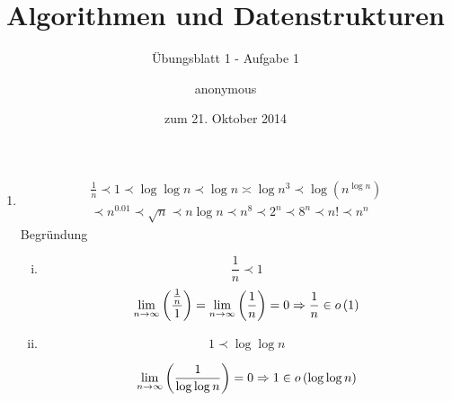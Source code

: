 \documentclass[a4paper]{scrartcl}
\title{Algorithmen und Datenstrukturen}
\subtitle{Übungsblatt 1 - Aufgabe 1}
\author{
    anonymous
}
\date{zum 21. Oktober 2014}
\begin{document}
\maketitle

\begin{enumerate}
    \item
        \begin{equation}[(a)]
            \begin{gathered}
                \frac{1}{n}
                \prec
                1
                \prec
                \log \log n
                \prec
                \log n
                \asymp
                \log n^3
                \prec
                \log \left( n^{\log n} \right) \\
                \prec
                n^{\num{0,01}}
                \prec
                \sqrt{n}
                \prec
                n \log n
                \prec
                n^8
                \prec
                2^n
                \prec
                8^n
                \prec
                n!
                \prec
                n^n
            \end{gathered}
        \end{equation}
        Begründung
        \begin{enumerate}[i.]
            \item
                \begin{equation*}
                    \frac{1}{n} \prec 1
                \end{equation*}
                \begin{equation*}
                    \lim_{n \to \infty} \left( \frac{\frac{1}{n}}{1} \right)
                    = \lim_{n \to \infty} \left( \frac{1}{n} \right)
                    = 0 \Rightarrow \frac{1}{n} \in o \left( 1 \right)
                \end{equation*}
                
            \item
                \begin{equation*}
                    1 \prec \log \log n
                \end{equation*}

                \begin{equation*}
                    \lim_{n \to \infty} \left( \frac{1}{\log \log n} \right)
                    = 0 \Rightarrow 1 \in o \left( \log \log n \right)
                \end{equation*}


\end{enumerate}
\end{enumerate}
\end{document}
